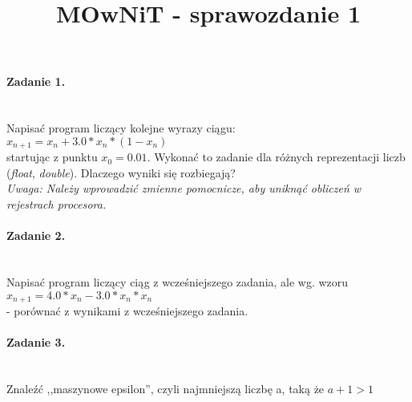 \documentclass{article}
\title{MOwNiT - sprawozdanie 1}
\begin{document}
  \lstset{language=C}

  \maketitle
  \thispagestyle{empty}
  \newpage

  \paragraph{Zadanie 1.} ~\\
  Napisać program liczący kolejne wyrazy ciągu: \\
  $ x_{n+1} = x_{n} + 3.0 * x_{n} * (1 - x_{n}) $ \\
  startując z punktu $ x_{0} = 0.01 $.
  Wykonać to zadanie dla różnych reprezentacji liczb (\textit{float}, \textit{double}).
  Dlaczego wyniki się rozbiegają? \\
  \textit{Uwaga: Należy wprowadzić zmienne pomocnicze, aby uniknąć obliczeń w rejestrach procesora.} \\
  
  \newpage

  \paragraph{Zadanie 2.} ~\\
  Napisać program liczący ciąg z wcześniejszego zadania, ale wg. wzoru \\
  $ x_{n+1} = 4.0 * x_{n} - 3.0 * x_{n} * x_{n} $ \\
  - porównać z wynikami z wcześniejszego zadania. \\
  
  \newpage

  \paragraph{Zadanie 3.} ~\\
  Znaleźć ,,maszynowe epsilon'', czyli najmniejszą liczbę a, taką że $ a + 1 > 1 $ \\
  
  \newpage
\end{document}
